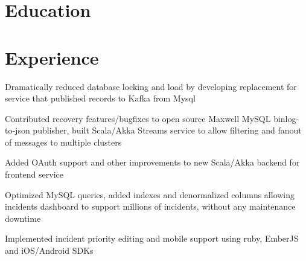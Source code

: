 \documentclass[12pt]{jmichaud-resume}
\begin{document}
\begin{minipage}[t]{0.3\textwidth}
\vspace{20pt}

\section{Education} 



\end{minipage}
\hfill
\begin{minipage}[t]{0.65\textwidth}
\section{Experience}
 \hfill {}

\vspace{7pt}
\begin{tightemize}
	\item Dramatically reduced database locking and load by developing replacement for service that published records to Kafka from Mysql
	\item Contributed recovery features/bugfixes to open source Maxwell MySQL binlog-to-json publisher, built Scala/Akka Streams service to allow filtering and fanout of messages to multiple clusters
	\item Added OAuth support and other improvements to new Scala/Akka backend for frontend service
	
\end{tightemize}
\sectionsep
{}\hfill {}

\begin{tightemize}
	\item Optimized MySQL queries, added indexes and denormalized columns allowing incidents dashboard to support millions of incidents, without any maintenance downtime
	\item Implemented incident priority editing and mobile support using ruby, EmberJS and iOS/Android SDKs
\end{tightemize}
\sectionsep

 \hfill {}


\end{minipage}
\end{document}

